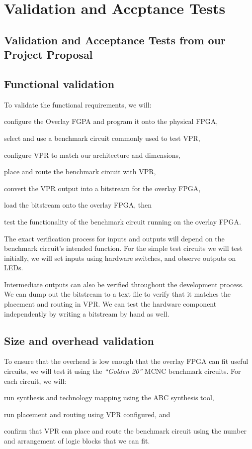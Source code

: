 \section{Validation and Accptance Tests} %

\subsection*{Validation and Acceptance Tests from our Project Proposal}

\subsection{Functional validation}

To validate the functional requirements, we will:
\begin{enumeration}
	\item configure the Overlay FGPA and program it onto the physical FPGA,
	\item select and use a benchmark circuit commonly used to test VPR,
	\item configure VPR to match our architecture and dimensions,
	\item place and route the benchmark circuit with VPR,
	\item convert the VPR output into a bitstream for the overlay FPGA,
	\item load the bitstream onto the overlay FPGA, then 
	\item test the functionality of the benchmark circuit running on the overlay FPGA.
\end{enumeration}

The exact verification process for inputs and outputs will depend on the benchmark circuit's intended function.
For the simple test circuits we will test initially, we will set inputs using hardware switches, and observe outputs on LEDs.

Intermediate outputs can also be verified throughout the development process.
We can dump out the bitstream to a text file to verify that it matches the placement and routing in VPR.
We can test the hardware component independently by writing a bitstream by hand as well.


\subsection{Size and overhead validation}

To ensure that the overhead is low enough that the overlay FPGA can fit useful circuits, we will test it using the \emph{``Golden 20''} MCNC benchmark circuits.
For each circuit, we will:
\begin{enumeration}
	\item run synthesis and technology mapping using the ABC synthesis tool,
	\item run placement and routing using VPR configured, and
	\item confirm that VPR can place and route the benchmark circuit using the number and arrangement of logic blocks that we can fit.
\end{enumeration}

